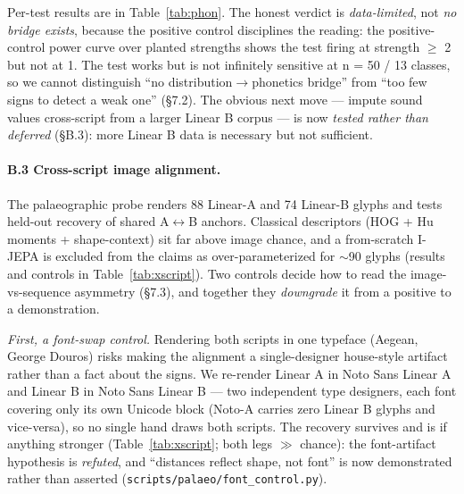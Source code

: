 Per-test results are in Table~\ref{tab:phon}. The honest verdict is
\emph{data-limited},
not \emph{no bridge exists}, because the positive control disciplines the
reading: the positive-control power curve over planted strengths shows
the test firing at strength $\ge$ 2 but not at 1. The test
works but is not infinitely sensitive at n = 50 / 13 classes, so we cannot
distinguish ``no distribution$\rightarrow$phonetics bridge'' from ``too few
signs to detect a weak one'' (\S7.2). The obvious next move --- impute sound
values cross-script from a larger Linear B corpus --- is now \emph{tested
rather than deferred} (\S B.3): more Linear B data is necessary but not
sufficient.

\paragraph{B.3 Cross-script image alignment.} The palaeographic probe
renders 88 Linear-A and 74 Linear-B glyphs and tests held-out recovery of
shared A$\leftrightarrow$B anchors. Classical descriptors (HOG + Hu moments
+ shape-context) sit far above image chance, and a from-scratch I-JEPA is
excluded from the claims as over-parameterized for $\sim$90 glyphs
(results and controls in Table~\ref{tab:xscript}). Two controls decide how
to read the image-vs-sequence asymmetry (\S7.3), and together they
\emph{downgrade} it from a positive to a demonstration.

\emph{First, a font-swap control.} Rendering both scripts in one typeface
(Aegean, George Douros) risks making the alignment a single-designer
house-style artifact rather than a fact about the signs. We re-render Linear
A in Noto Sans Linear A and Linear B in Noto Sans Linear B --- two
independent type designers, each font covering only its own Unicode block
(Noto-A carries zero Linear B glyphs and vice-versa), so no single hand
draws both scripts. The recovery survives and is if anything stronger
(Table~\ref{tab:xscript}; both legs $\gg$ chance): the font-artifact
hypothesis is \emph{refuted}, and ``distances reflect shape, not font'' is
now demonstrated rather than asserted
(\texttt{scripts/\allowbreak palaeo/\allowbreak font\_control.py}).

